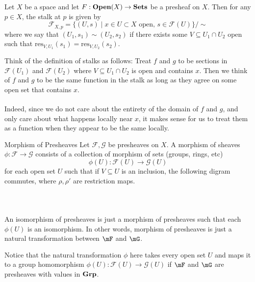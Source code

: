 \documentclass[a4paper]{article}
\begin{document}
\begin{lmm}{}{} Let $X$ be a space and let $F:\bold{Open}(X)\to\bold{Sets}$ be a presheaf on $X$. Then for any $p\in X$, the stalk at $p$ is given by $$\mathcal{F}_{X,p}=\{(U,s)\;|\;x\in U\subset X\text{ open, }s\in\mathcal{F}(U)\}/\sim$$ where we say that $(U_1,s_1)\sim(U_2,s_2)$ if there exists some $V\subseteq U_1\cap U_2$ open such that $\text{res}_{V,U_1}(s_1)=\text{res}_{V,U_2}(s_2)$. 
\end{lmm}

Think of the definition of stalks as follows: Treat $f$ and $g$ to be sections in $\mathcal{F}(U_1)$ and $\mathcal{F}(U_2)$ where $V\subseteq U_1\cap U_2$ is open and contains $x$. Then we think of $f$ and $g$ to be the same function in the stalk as long as they agree on some open set that contains $x$. \\~\\

Indeed, since we do not care about the entirety of the domain of $f$ and $g$, and only care about what happens locally near $x$, it makes sense for us to treat them as a function when they appear to be the same locally. 

\begin{defn}{Morphism of Presheaves}{} Let $\mathcal{F},\mathcal{G}$ be presheaves on $X$. A morphism of sheaves $\phi:\mathcal{F}\to\mathcal{G}$ consists of a collection of morphism of sets (groups, rings, etc) $$\phi(U):\mathcal{F}(U)\to\mathcal{G}(U)$$ for each open set $U$ such that if $V\subseteq U$ is an inclusion, the following digram commutes, where $\rho,\rho'$ are restriction maps. \\~\\
 \\~\\
An isomorphism of presheaves is just a morphism of presheaves such that each $\phi(U)$ is an isomorphism. In other words, morphism of presheaves is just a natural transformation between $\mF$ and $\mG$.  
\end{defn}

Notice that the natural transformation $\phi$ here takes every open set $U$ and maps it to a group homomorphism $\phi(U):\mathcal{F}(U)\to\mathcal{G}(U)$ if $\mF$ and $\mG$ are presheaves with values in $\bold{Grp}$. 
\end{document}
